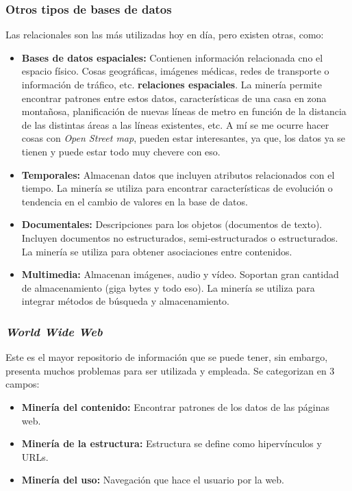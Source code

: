 \documentclass{article}
\begin{document}
\subsubsection{Otros tipos de bases de datos}

Las relacionales son las más utilizadas hoy en día, pero existen otras, como:

\begin{itemize}
  \item \textbf{Bases de datos espaciales:} Contienen información relacionada cno el espacio físico. Cosas geográficas, imágenes médicas, redes de transporte o información de tráfico, etc. \textbf{relaciones espaciales}. La minería permite encontrar patrones entre estos datos, características de una casa en zona montañosa, planificación de nuevas líneas de metro en función de la distancia de las distintas áreas a las líneas existentes, etc. A mí se me ocurre hacer cosas con \textit{Open Street map}, pueden estar interesantes, ya que, los datos ya se tienen y puede estar todo muy chevere con eso.
  \item \textbf{Temporales:} Almacenan datos que incluyen atributos relacionados con el tiempo. La minería se utiliza para encontrar características de evolución o tendencia en el cambio de valores en la base de datos.
  \item \textbf{Documentales:} Descripciones para los objetos (documentos de texto). Incluyen documentos no estructurados, semi-estructurados o estructurados. La minería se utiliza para obtener asociaciones entre contenidos.
  \item \textbf{Multimedia:} Almacenan imágenes, audio y vídeo. Soportan gran cantidad de almacenamiento (giga bytes y todo eso). La minería se utiliza para integrar métodos de búsqueda y almacenamiento.
\end{itemize}

\subsubsection{\textit{World Wide Web}}

Este es el mayor repositorio de información que se puede tener, sin embargo, presenta muchos problemas para ser utilizada y empleada. Se categorizan en 3 campos:
\begin{itemize}
  \item \textbf{Minería del contenido:} Encontrar patrones de los datos de las páginas web.
  \item \textbf{Minería de la estructura:} Estructura se define como hipervínculos y URLs.
  \item \textbf{Minería del uso:} Navegación que hace el usuario por la web.
\end{itemize}
\end{document}
